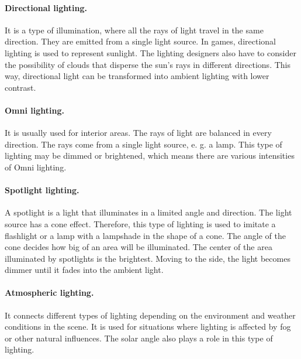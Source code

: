 \documentclass[10pt,twoside,english,a4paper]{article}
\begin{document}
\paragraph{Directional lighting.}
It is a type of illumination, where all the rays of light travel in the same direction. They are emitted from a single light source. In games, directional lighting is used to represent sunlight. The lighting designers also have to consider the possibility of clouds that disperse the sun's rays in different directions. This way, directional light can be transformed into ambient lighting with lower contrast. \cite{Prall} 

\paragraph{Omni lighting.}
It is usually used for interior areas. The rays of light are balanced in every direction. The rays come from a single light source, e. g. a lamp. This type of lighting may be dimmed or brightened, which means there are various intensities of Omni lighting. \cite{Prall}

\paragraph{Spotlight lighting.}
A spotlight is a light that illuminates in a limited angle and direction. The light source has a cone effect. Therefore, this type of lighting is used to imitate a flashlight or a lamp with a lampshade in the shape of a cone. The angle of the cone decides how big of an area will be illuminated. The center of the area illuminated by spotlights is the brightest. Moving to the side, the light becomes dimmer until it fades into the ambient light. \cite{Houze}

\paragraph{Atmospheric lighting.}
It connects different types of lighting depending on the environment and weather conditions in the scene. It is used for situations where lighting is affected by fog or other natural influences. The solar angle also plays a role in this type of lighting. \cite{Tokarev}
\end{document}
